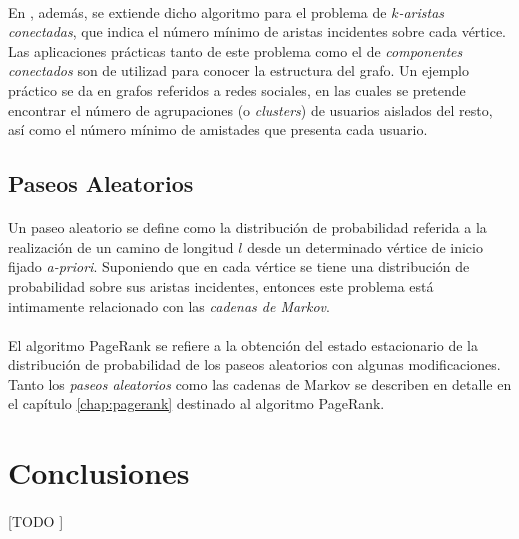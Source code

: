 \documentclass{subfiles}
\begin{document}
        \paragraph{}
        En \cite{ahn2012analyzing}, además, se extiende dicho algoritmo para el problema de \emph{$k$-aristas conectadas}, que indica el número mínimo de aristas incidentes sobre cada vértice. Las aplicaciones prácticas tanto de este problema como el de \emph{componentes conectados} son de utilizad para conocer la estructura del grafo. Un ejemplo práctico se da en grafos referidos a redes sociales, en las cuales se pretende encontrar el número de agrupaciones (o \emph{clusters}) de usuarios aislados del resto, así como el número mínimo de amistades que presenta cada usuario.

      \subsection{Paseos Aleatorios}
      \label{sec:random_walks}

        \paragraph{}
        Un paseo aleatorio se define como la distribución de probabilidad referida a la realización de un camino de longitud $l$ desde un determinado vértice de inicio fijado \emph{a-priori}. Suponiendo que en cada vértice se tiene una distribución de probabilidad sobre sus aristas incidentes, entonces este problema está intimamente relacionado con las \emph{cadenas de Markov}.

        \paragraph{}
        El algoritmo PageRank se refiere a la obtención del estado estacionario de la distribución de probabilidad de los paseos aleatorios con algunas modificaciones. Tanto los \emph{paseos aleatorios} como las cadenas de Markov se describen en detalle en el capítulo \ref{chap:pagerank} destinado al algoritmo PageRank.

    \section{Conclusiones}
    \label{sec:graphs_conclusions}

      \paragraph{}
      [TODO ]
\end{document}
